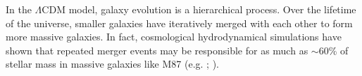 \documentclass[iop,revtex4,twocolumn,apj,numberedappendix,appendixfloats]{emulateapj}
\begin{document}
In the $\Lambda$CDM model, galaxy evolution is a hierarchical process. Over the lifetime of the universe, smaller galaxies have iteratively merged with each other to form more massive galaxies. In fact, cosmological hydrodynamical simulations have shown that repeated merger events may be responsible for as much as $\sim$60\% of stellar mass in massive galaxies like M87 (e.g. \citet{Rodriguez-Gomez:2016}; \citet{Pillepich:2018}). \\





\end{document}

